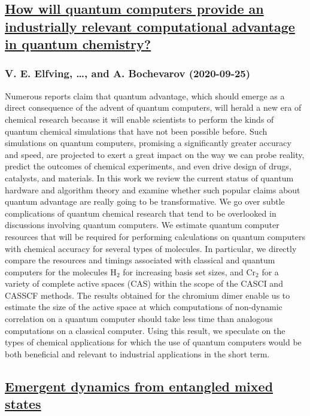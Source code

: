 \subsection*{\href{http://arxiv.org/abs/2009.12472v1}{How will quantum computers provide an industrially relevant  computational advantage in quantum chemistry?}}
\subsubsection*{V. E. Elfving, \dots, and A. Bochevarov (2020-09-25)}
Numerous reports claim that quantum advantage, which should emerge as a
direct consequence of the advent of quantum computers, will herald a new era of
chemical research because it will enable scientists to perform the kinds of
quantum chemical simulations that have not been possible before. Such
simulations on quantum computers, promising a significantly greater accuracy
and speed, are projected to exert a great impact on the way we can probe
reality, predict the outcomes of chemical experiments, and even drive design of
drugs, catalysts, and materials. In this work we review the current status of
quantum hardware and algorithm theory and examine whether such popular claims
about quantum advantage are really going to be transformative. We go over
subtle complications of quantum chemical research that tend to be overlooked in
discussions involving quantum computers. We estimate quantum computer resources
that will be required for performing calculations on quantum computers with
chemical accuracy for several types of molecules. In particular, we directly
compare the resources and timings associated with classical and quantum
computers for the molecules H$_2$ for increasing basis set sizes, and Cr$_2$
for a variety of complete active spaces (CAS) within the scope of the CASCI and
CASSCF methods. The results obtained for the chromium dimer enable us to
estimate the size of the active space at which computations of non-dynamic
correlation on a quantum computer should take less time than analogous
computations on a classical computer. Using this result, we speculate on the
types of chemical applications for which the use of quantum computers would be
both beneficial and relevant to industrial applications in the short term.

\subsection*{\href{http://arxiv.org/abs/2009.12451v1}{Emergent dynamics from entangled mixed states}}
